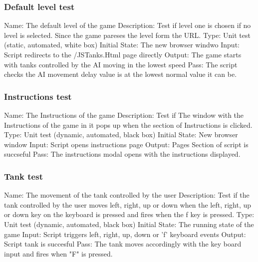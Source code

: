 \documentclass{article}
\begin{document}
\subsubsection{Default level test}
Name:  The default level of the game\newline
Description: Test if level one is chosen if no level is selected. Since the
game pareses the level form the URL.  \newline
Type: Unit test (static, automated, white box) \newline
Initial State: The new browser windwo \newline
Input: Script redirects to the /JSTanks.Html page directly \newline
Output: The game starts with tanks controlled by the AI moving in the lowest 
speed\newline
Pass: The script checks the AI movement delay value is at the lowest normal
 value it can be.\newline

\subsubsection{Instructions test}
Name:  The Instructions of the game\newline
Description: Test if The window with the Instructions of the game in it pops up 
when the section of Instructions is clicked. \newline
Type: Unit test (dynamic, automated, black box) \newline
Initial State: New browser window \newline
Input: Script opens instructions page\newline
Output: Pages Section of script is succseful\newline
Pass:  The instructions modal opens with the instructions displayed.  \newline

\subsubsection{Tank test}
Name:  The movement of the tank controlled by the user\newline
Description: Test if the tank controlled by the user moves left, right, up or 
down when the left, right, up or down key on the keyboard is pressed and
fires when the f key is pressed. \newline
Type: Unit test (dynamic, automated, black box) \newline
Initial State:  The running state of the game \newline
Input: Script triggers left, right, up, down or 'f' keyboard events\newline
Output: Script tank is succesful\newline
Pass: The tank moves accordingly with the key board input and 
fires when "F" is pressed. \newline
\end{document}
